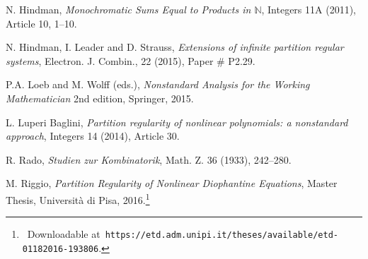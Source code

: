 \documentclass[11pt]{amsart}
\theoremstyle{definition}
\theoremstyle{remark}
\numberwithin{equation}{section}
\begin{document}
\begin{thebibliography}{99}
 N. Hindman, 
\emph{Monochromatic Sums Equal to Products in $\mathbb{N}$}, 
Integers 11A (2011), Article 10, 1--10. 

 N. Hindman, I. Leader and D. Strauss,
\emph{Extensions of infinite partition regular systems},
Electron. J. Combin., 22 (2015), Paper \# P2.29.

P.A. Loeb and M. Wolff (eds.),
\emph{Nonstandard Analysis for the Working Mathematician}
2nd edition, Springer, 2015.

 L. Luperi Baglini, 
\emph{Partition regularity of nonlinear polynomials: a nonstandard approach}, 
Integers 14 (2014), Article 30.

 R. Rado, 
\emph{Studien zur Kombinatorik}, Math. Z. 36 (1933), 242--280.

M. Riggio, \emph{Partition Regularity of Nonlinear Diophantine
Equations}, Master Thesis, Universit\`a di Pisa, 2016.\footnote
{~Downloadable at\,
\texttt{https://etd.adm.unipi.it/theses/available/etd-01182016-193806}.}
\end{thebibliography}
\end{document}
